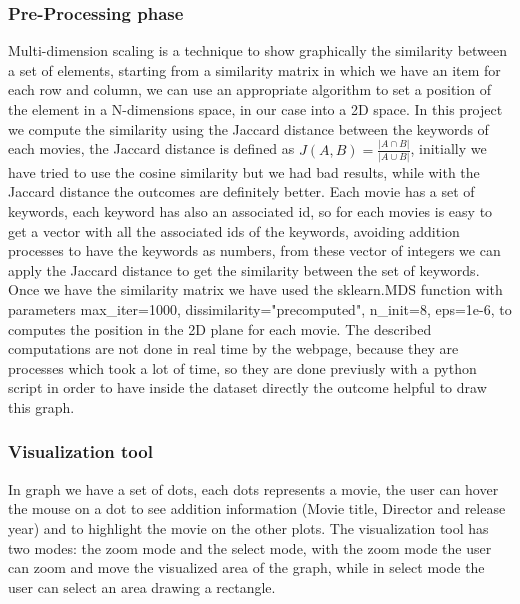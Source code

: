 \documentclass[]{article}
\begin{document}
\subsubsection{Pre-Processing phase}
Multi-dimension scaling is a technique to show graphically the similarity between a set of elements, starting from a similarity matrix in which we have an item for each row and column, we can use an appropriate algorithm to set a position of the element in a N-dimensions space, in our case into a 2D space.\newline
In this project we compute the similarity using the Jaccard distance between the keywords of each movies, the Jaccard distance is defined as $J(A,B)=\frac{|A\cap B|}{|A\cup B|}$, initially we have tried to use the cosine similarity but we had bad results, while with the Jaccard distance the outcomes are definitely better.\newline
Each movie has a set of keywords, each keyword has also an associated id, so for each movies is easy to get a vector with all the associated ids of the keywords, avoiding addition processes to have the keywords as numbers, from these vector of integers we can apply the Jaccard distance to get the similarity between the set of keywords.\newline
Once we have the similarity matrix we have used the sklearn.MDS function with parameters max\_iter=1000, dissimilarity="precomputed", n\_init=8, eps=1e-6, to computes the position in the 2D plane for each movie.\newline
The described computations are not done in real time by the webpage, because they are processes which took a lot of time, so they are done previusly with a python script in order to have inside the dataset directly the outcome helpful to draw this graph.
\subsubsection{Visualization tool}
In graph we have a set of dots, each dots represents a movie, the user can hover the mouse on a dot to see addition information (Movie title, Director and release year) and to highlight the movie on the other plots.\newline
The visualization tool has two modes: the zoom mode and the select mode, with the zoom mode the user can zoom and move the visualized area of the graph, while in select mode the user can select an area drawing a rectangle.
\end{document}
